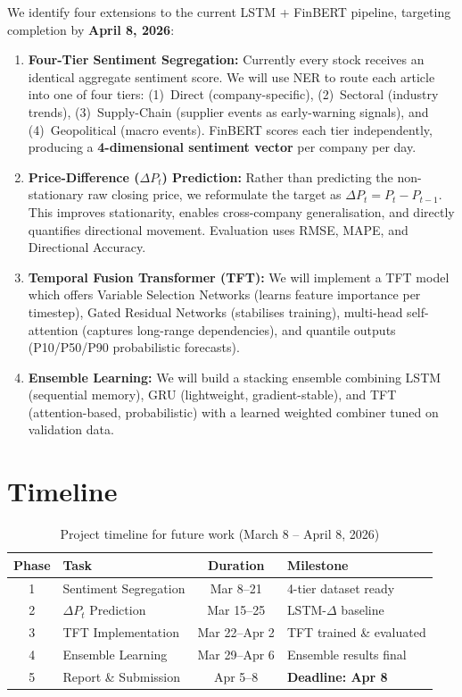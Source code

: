 \documentclass[11pt]{article}
\begin{document}
We identify four extensions to the current LSTM + FinBERT pipeline, targeting completion by \textbf{April 8, 2026}:

\begin{enumerate}[noitemsep, topsep=3pt, leftmargin=*]
  \item \textbf{Four-Tier Sentiment Segregation:} Currently every stock receives an identical aggregate sentiment score. We will use NER to route each article into one of four tiers: (1)~Direct (company-specific), (2)~Sectoral (industry trends), (3)~Supply-Chain (supplier events as early-warning signals), and (4)~Geopolitical (macro events). FinBERT scores each tier independently, producing a \textbf{4-dimensional sentiment vector} per company per day.

  \item \textbf{Price-Difference ($\Delta P_t$) Prediction:} Rather than predicting the non-stationary raw closing price, we reformulate the target as $\Delta P_t = P_t - P_{t-1}$. This improves stationarity, enables cross-company generalisation, and directly quantifies directional movement. Evaluation uses RMSE, MAPE, and Directional Accuracy.

  \item \textbf{Temporal Fusion Transformer (TFT):} We will implement a TFT model which offers Variable Selection Networks (learns feature importance per timestep), Gated Residual Networks (stabilises training), multi-head self-attention (captures long-range dependencies), and quantile outputs (P10/P50/P90 probabilistic forecasts).

  \item \textbf{Ensemble Learning:} We will build a stacking ensemble combining LSTM (sequential memory), GRU (lightweight, gradient-stable), and TFT (attention-based, probabilistic) with a learned weighted combiner tuned on validation data.
\end{enumerate}

\section{Timeline}

\begin{table}[h]
\centering
\small
\begin{tabular}{c l c l}
\hline
\textbf{Phase} & \textbf{Task} & \textbf{Duration} & \textbf{Milestone} \\
\hline
1 & Sentiment Segregation & Mar 8--21 & 4-tier dataset ready \\
2 & $\Delta P_t$ Prediction & Mar 15--25 & LSTM-$\Delta$ baseline \\
3 & TFT Implementation & Mar 22--Apr 2 & TFT trained \& evaluated \\
4 & Ensemble Learning & Mar 29--Apr 6 & Ensemble results final \\
5 & Report \& Submission & Apr 5--8 & \textbf{Deadline: Apr 8} \\
\hline
\end{tabular}
\caption{Project timeline for future work (March 8 -- April 8, 2026)}
\end{table}
\end{document}
